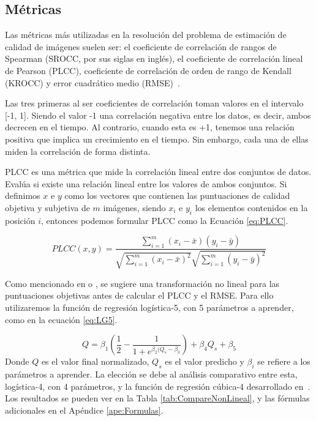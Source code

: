 \subsection{Métricas}
\label{sec:Metricas}
Las métricas más utilizadas en la resolución del problema de estimación de calidad 
de imágenes suelen ser: el coeficiente de correlación de rangos de Spearman (SROCC, 
por sus siglas en inglés), el coeficiente de correlación lineal de Pearson (PLCC), coeficiente de correlación de orden de rango de Kendall (KROCC)
y error cuadrático medio (RMSE)~\cite{VisualMedicalQualityBook}.

Las tres primeras al ser coeficientes de correlación toman valores en el intervalo 
[-1, 1]. Siendo el valor -1 una correlación negativa entre los datos, es decir,
ambos decrecen en el tiempo. Al contrario, cuando esta es +1, tenemos una relación 
positiva que implica un crecimiento en el tiempo. Sin embargo, cada una de ellas 
miden la correlación de forma distinta. 

PLCC es una métrica que mide la correlación lineal entre dos conjuntos de datos.
Evalúa si existe una relación lineal entre los valores de ambos conjuntos.
Si definimos $x$ e $y$ como los vectores que contienen las puntuaciones de 
calidad objetiva y subjetiva de $m$ imágenes, siendo $x_i$ e $y_i$ 
los elementos contenidos en la posición $i$, entonces podemos formular 
PLCC como la Ecuación \eqref{eq:PLCC}.

\begin{equation}
  PLCC(x,y) = \frac{\sum_{i=1}^m (x_i - \bar x)(y_i - \bar y)}{\sqrt{\sum_{i=1}^m (x_i - \bar x)^2}\sqrt{\sum_{i=1}^m (y_i - \bar y)^2}}
\label{eq:PLCC}
\end{equation}

Como mencionado en \cite{ResSCNN} o \cite{VQA-PC}, se sugiere una transformación 
no lineal para las puntuaciones objetivas antes de calcular el PLCC y el RMSE.
Para ello utilizaremos la función de regresión logística-5, con 5 parámetros a aprender,
como en la ecuación \eqref{eq:LG5}. 

\begin{equation}
  Q = \beta_1 \left(\frac{1}{2} - \frac{1}{1+e^{\beta_2 (Q_s-\beta_3}} \right) + \beta_4 Q_s + \beta_5
  \label{eq:LG5}
\end{equation}
Donde $Q$ es el valor final normalizado, $Q_s$ es el valor predicho y $\beta_i$ se 
refiere a los parámetros a aprender.
La elección se debe al análisis comparativo entre esta, logística-4, con 4 parámetros, y la función de regresión cúbica-4
desarrollado en~\cite{ResSCNN}. Los resultados se pueden ver en la Tabla \ref{tab:CompareNonLineal}, 
y las fórmulas adicionales en el Apéndice \ref{ape:Formulas}.

